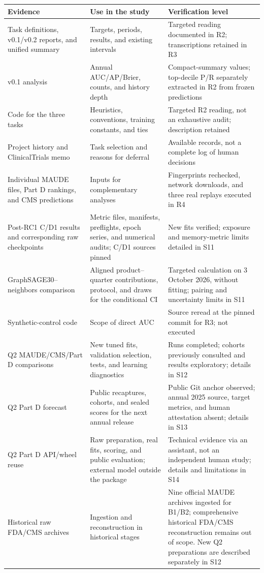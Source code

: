 \documentclass[10pt,a4paper]{article}
\begin{document}
\begin{tabularx}{\linewidth}{@{}p{31mm}Xp{39mm}@{}}
\toprule
Evidence & Use in the study & Verification level\\
\midrule
Task definitions, v0.1/v0.2 reports, and unified summary & Targets, periods, results, and existing intervals & Targeted reading documented in R2; transcriptions retained in R3\\
v0.1 analysis & Annual AUC/AP/Brier, counts, and history depth & Compact-summary values; top-decile P/R separately extracted in R2 from frozen predictions\\
Code for the three tasks & Heuristics, conventions, training constants, and ties & Targeted R2 reading, not an exhaustive audit; description retained\\
Project history and ClinicalTrials memo & Task selection and reasons for deferral & Available records, not a complete log of human decisions\\
Individual MAUDE files, Part D rankings, and CMS predictions & Inputs for complementary analyses & Fingerprints rechecked, network downloads, and three real replays executed in R4\\
Post-RC1 C/D1 results and corresponding raw checkpoints & Metric files, manifests, preflights, epoch series, and numerical audits; C/D1 sources pinned & New fits verified; exposure and memory-metric limits detailed in S11\\
GraphSAGE30--neighbors comparison & Aligned product--quarter contributions, protocol, and draws for the conditional CI & Targeted calculation on 3 October 2026, without fitting; pairing and uncertainty limits in S11\\
Synthetic-control code & Scope of direct AUC & Source reread at the pinned commit for R3; not executed\\
Q2 MAUDE/CMS/Part D comparisons & New tuned fits, validation selection, tests, and learning diagnostics & Runs completed; cohorts previously consulted and results exploratory; details in S12\\
Q2 Part D forecast & Public recaptures, cohorts, and sealed scores for the next annual release & Public Git anchor observed; annual 2025 source, target metrics, and human attestation absent; details in S13\\
Q2 Part D API/wheel reuse & Raw preparation, real fits, scoring, and public evaluation; external model outside the package & Technical evidence via an assistant, not an independent human study; details and limitations in S14\\
Historical raw FDA/CMS archives & Ingestion and reconstruction in historical stages & Nine official MAUDE archives ingested for B1/B2; comprehensive historical FDA/CMS reconstruction remains out of scope. New Q2 preparations are described separately in S12\\
\bottomrule
\end{tabularx}
\end{document}

